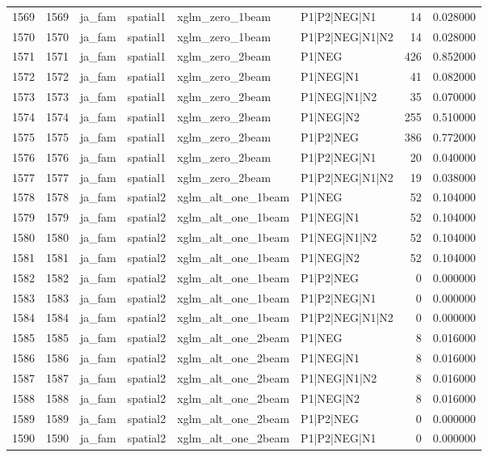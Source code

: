 \begin{tabular}{lrllllrr}
1569 & 1569 & ja_fam & spatial1 & xglm_zero_1beam & P1|P2|NEG|N1 & 14 & 0.028000 \\
1570 & 1570 & ja_fam & spatial1 & xglm_zero_1beam & P1|P2|NEG|N1|N2 & 14 & 0.028000 \\
1571 & 1571 & ja_fam & spatial1 & xglm_zero_2beam & P1|NEG & 426 & 0.852000 \\
1572 & 1572 & ja_fam & spatial1 & xglm_zero_2beam & P1|NEG|N1 & 41 & 0.082000 \\
1573 & 1573 & ja_fam & spatial1 & xglm_zero_2beam & P1|NEG|N1|N2 & 35 & 0.070000 \\
1574 & 1574 & ja_fam & spatial1 & xglm_zero_2beam & P1|NEG|N2 & 255 & 0.510000 \\
1575 & 1575 & ja_fam & spatial1 & xglm_zero_2beam & P1|P2|NEG & 386 & 0.772000 \\
1576 & 1576 & ja_fam & spatial1 & xglm_zero_2beam & P1|P2|NEG|N1 & 20 & 0.040000 \\
1577 & 1577 & ja_fam & spatial1 & xglm_zero_2beam & P1|P2|NEG|N1|N2 & 19 & 0.038000 \\
1578 & 1578 & ja_fam & spatial2 & xglm_alt_one_1beam & P1|NEG & 52 & 0.104000 \\
1579 & 1579 & ja_fam & spatial2 & xglm_alt_one_1beam & P1|NEG|N1 & 52 & 0.104000 \\
1580 & 1580 & ja_fam & spatial2 & xglm_alt_one_1beam & P1|NEG|N1|N2 & 52 & 0.104000 \\
1581 & 1581 & ja_fam & spatial2 & xglm_alt_one_1beam & P1|NEG|N2 & 52 & 0.104000 \\
1582 & 1582 & ja_fam & spatial2 & xglm_alt_one_1beam & P1|P2|NEG & 0 & 0.000000 \\
1583 & 1583 & ja_fam & spatial2 & xglm_alt_one_1beam & P1|P2|NEG|N1 & 0 & 0.000000 \\
1584 & 1584 & ja_fam & spatial2 & xglm_alt_one_1beam & P1|P2|NEG|N1|N2 & 0 & 0.000000 \\
1585 & 1585 & ja_fam & spatial2 & xglm_alt_one_2beam & P1|NEG & 8 & 0.016000 \\
1586 & 1586 & ja_fam & spatial2 & xglm_alt_one_2beam & P1|NEG|N1 & 8 & 0.016000 \\
1587 & 1587 & ja_fam & spatial2 & xglm_alt_one_2beam & P1|NEG|N1|N2 & 8 & 0.016000 \\
1588 & 1588 & ja_fam & spatial2 & xglm_alt_one_2beam & P1|NEG|N2 & 8 & 0.016000 \\
1589 & 1589 & ja_fam & spatial2 & xglm_alt_one_2beam & P1|P2|NEG & 0 & 0.000000 \\
1590 & 1590 & ja_fam & spatial2 & xglm_alt_one_2beam & P1|P2|NEG|N1 & 0 & 0.000000 \\

\end{tabular}
